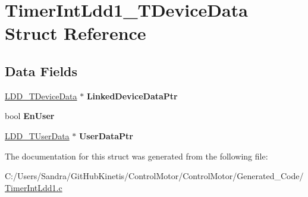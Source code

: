 \hypertarget{struct_timer_int_ldd1___t_device_data}{}\section{Timer\+Int\+Ldd1\+\_\+\+T\+Device\+Data Struct Reference}
\label{struct_timer_int_ldd1___t_device_data}
\subsection*{Data Fields}
\begin{DoxyCompactItemize}
\item 
\hyperlink{group___p_e___types__module_gac5cf1362f1f0e3a2ce71b1bf2276d091}{L\+D\+D\+\_\+\+T\+Device\+Data} $\ast$ {\bfseries Linked\+Device\+Data\+Ptr}\hypertarget{struct_timer_int_ldd1___t_device_data_a00c04d809c08f8d1a5e0a0f5aaee94d9}{}\label{struct_timer_int_ldd1___t_device_data_a00c04d809c08f8d1a5e0a0f5aaee94d9}

\item 
bool {\bfseries En\+User}\hypertarget{struct_timer_int_ldd1___t_device_data_ad3f66f696819617171b0a89842a72e93}{}\label{struct_timer_int_ldd1___t_device_data_ad3f66f696819617171b0a89842a72e93}

\item 
\hyperlink{group___p_e___types__module_ga0b66a73f87238a782318aa0be7578e35}{L\+D\+D\+\_\+\+T\+User\+Data} $\ast$ {\bfseries User\+Data\+Ptr}\hypertarget{struct_timer_int_ldd1___t_device_data_ac8d630b624b953cb570ae524bb618389}{}\label{struct_timer_int_ldd1___t_device_data_ac8d630b624b953cb570ae524bb618389}

\end{DoxyCompactItemize}


The documentation for this struct was generated from the following file\+:\begin{DoxyCompactItemize}
\item 
C\+:/\+Users/\+Sandra/\+Git\+Hub\+Kinetis/\+Control\+Motor/\+Control\+Motor/\+Generated\+\_\+\+Code/\hyperlink{_timer_int_ldd1_8c}{Timer\+Int\+Ldd1.\+c}\end{DoxyCompactItemize}
